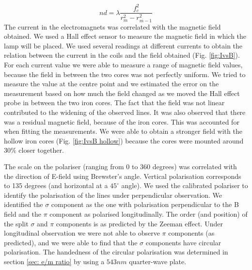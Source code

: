 \documentclass[11pt]{article}
\begin{document}
\begin{equation}
    nd = \lambda \frac{f_c^2}{r_m^2-r_{m-1}^2} \label{eq: d}
\end{equation}
The current in the electromagnets was correlated with the magnetic field obtained. We used a Hall effect sensor to measure the magnetic field in which the lamp will be placed. We used several readings at different currents to obtain the relation between the current in the coils and the field obtained (Fig. \ref{fig:IvsB}). For each current value we were able to measure a range of magnetic field values, because the field in between the two cores was not perfectly uniform. We tried to measure the value at the centre point and we estimated the error on the measurement based on how much the field changed as we moved the Hall effect probe in between the two iron cores. The fact that the field was not linear contributed to the widening of the observed lines. It was also observed that there was a residual magnetic field, because of the iron cores. This was accounted for when fitting the measurements. We were able to obtain a stronger field with the hollow iron cores (Fig. \ref{fig:IvsB hollow}) because the cores were mounted around $30\%$ closer together.

The scale on the polariser (ranging from 0 to 360 degrees) was correlated with the direction of E-field using Brewster's angle. Vertical polarisation corresponds to 135 degrees (and horizontal at a $45^\circ$ angle). We used the calibrated polariser to identify the polarisation of the lines under perpendicular observation. We identified the $\sigma$ component as the one with polarisation perpendicular to the B field and the $\pi$ component as polarised longitudinally. The order (and position) of the split $\sigma$ and $\pi$ components is as predicted by the Zeeman effect. Under longitudinal observation we were not able to observe $\pi$ components (as predicted), and we were able to find that the $\sigma$ components have circular polarisation. The handedness of the circular polarisation was determined in section \ref{sec: e/m ratio} by using a $543 \si{nm}$ quarter-wave plate. 
\end{document}

